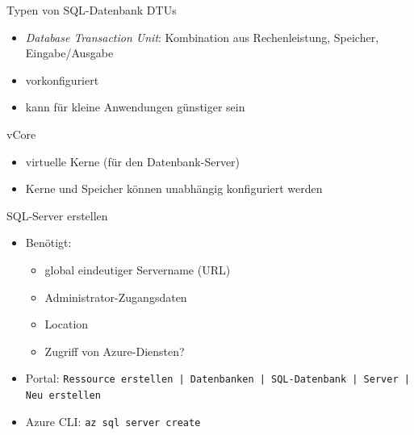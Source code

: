 \begin{flashcard}[Definition]{Typen von SQL-Datenbank}
    DTUs
    \begin{itemize}
        \item \emph{Database Transaction Unit}:\newline
            Kombination aus Rechenleistung, Speicher, Eingabe/Ausgabe
        \item vorkonfiguriert
        \item kann für kleine Anwendungen günstiger sein
    \end{itemize}
    vCore
    \begin{itemize}
        \item virtuelle Kerne (für den Datenbank-Server)
        \item Kerne und Speicher können unabhängig konfiguriert werden
    \end{itemize}

\end{flashcard}

\begin{flashcard}[Definition]{SQL-Server erstellen}
    \begin{itemize}
        \item Benötigt:
            \begin{itemize}
                \item global eindeutiger Servername (URL)
                \item Administrator-Zugangsdaten
                \item Location
                \item Zugriff von Azure-Diensten?
            \end{itemize}
        \item Portal: \texttt{Ressource erstellen | Datenbanken | SQL-Datenbank | Server | Neu erstellen }
        \item Azure CLI: \newline
            \texttt{az sql server create}
    \end{itemize}
\end{flashcard}

